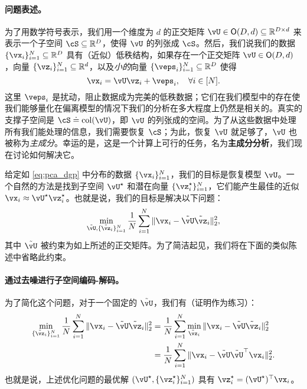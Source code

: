 \documentclass[../../book-main.tex]{subfiles}
\begin{document}
\paragraph{问题表述。}
为了用数学符号表示，我们用一个维度为 \(d\) 的正交矩阵 \(\vU \in \O(D, d) \subseteq \R^{D \times d}\) 来表示一个子空间 \(\cS \subseteq \R^{D}\)，使得 \(\vU\) 的列张成 \(\cS\)。然后，我们说我们的数据 \(\{\vx_{i}\}_{i = 1}^{N} \subseteq \R^{D}\) 具有（近似）低秩结构，如果存在一个正交矩阵 \(\vU \in \O(D, d)\)，向量 \(\{\vz_{i}\}_{i = 1}^{N} \subseteq \R^{d}\)，以及\textit{小的}向量 \(\{\veps_{i}\}_{i = 1}^{N} \subseteq \R^{D}\) 使得
\begin{equation}\label{eq:pca_dgp}
    \vx_{i} = \vU\vz_{i} + \veps_{i}, \quad \forall i \in [N].
\end{equation}
这里 \(\veps_{i}\) 是扰动，阻止数据成为完美的低秩数据；它们在我们模型中的存在使我们能够量化在偏离模型的情况下我们的分析在多大程度上仍然是相关的。真实的支撑子空间是 \(\cS \doteq \mathop{\mathrm{col}}(\vU)\)，即 \(\vU\) 的列张成的空间。为了从这些数据中处理所有我们能处理的信息，我们需要恢复 \(\cS\)；为此，恢复 \(\vU\) 就足够了，\(\vU\) 也被称为\textit{主成分}。幸运的是，这是一个计算上可行的任务，名为\textbf{主成分分析}，我们现在讨论如何解决它。

给定如 \eqref{eq:pca_dgp} 中分布的数据 \(\{\vx_{i}\}_{i = 1}^{N}\)，我们的目标是恢复模型 \(\vU\)。一个自然的方法是找到子空间 \(\vU^{\star}\) 和潜在向量 \(\{\vz_{i}^{\star}\}_{i = 1}^{N}\)，它们能产生最佳的近似 \(\vx_{i} \approx \vU^{\star}\vz_{i}^{\star}\)。也就是说，我们的目标是解决以下问题：
\begin{equation}\label{eq:pca_sparse_recovery_problem}
    \min_{\tilde{\vU}, \{\tilde{\vz}_{i}\}_{i = 1}^{N}}\frac{1}{N}\sum_{i = 1}^{N}\norm{\vx_{i} - \tilde{\vU}\tilde{\vz}_{i}}_{2}^{2},
\end{equation}
其中 \(\tilde{\vU}\) 被约束为如上所述的正交矩阵。为了简洁起见，我们将在下面的类似陈述中省略此约束。

\paragraph{通过去噪进行子空间编码-解码。}
为了简化这个问题，对于一个固定的 \(\tilde{\vU}\)，我们有（证明作为练习）：
\begin{align}
    \min_{\{\tilde{\vz}_{i}\}_{i = 1}^{N}}\frac{1}{N}\sum_{i = 1}^{N}\norm{\vx_{i} - \tilde{\vU}\tilde{\vz}_{i}}_{2}^{2} 
    &= \frac{1}{N}\sum_{i = 1}^{N}\min_{\tilde{\vz}_{i}}\norm{\vx_{i} - \tilde{\vU}\tilde{\vz}_{i}}_{2}^{2} \\
    &= \frac{1}{N}\sum_{i = 1}^{N}\norm{\vx_{i} - \tilde{\vU}\tilde{\vU}^{\top}\vx_{i}}_{2}^{2}. 
\end{align}
也就是说，上述优化问题的最优解 \((\vU^{\star}, \{\vz_{i}^{\star}\}_{i = 1}^{N})\) 具有 $\vz_i^{\star} = (\vU^{\star})^\top\vx_i$。
\end{document}
